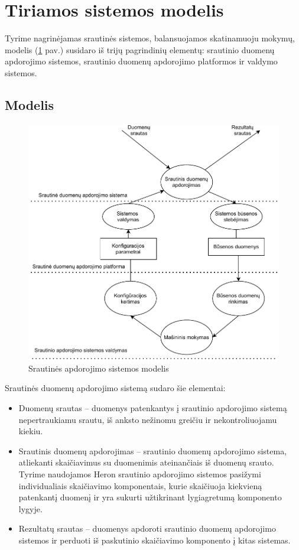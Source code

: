 \documentclass{VUMIFPSbakalaurinis}
\begin{document}
\section{Tiriamos sistemos modelis}

Tyrime nagrinėjamas srautinės sistemos, balansuojamos skatinamuoju mokymų, modelis (\ref{dataflow} pav.) susidaro iš trijų pagrindinių elementų: srautinio duomenų apdorojimo sistemos, srautinio duomenų apdorojimo platformos ir valdymo sistemos. 
\subsection{Modelis}
\begin{figure}[H]
    \includegraphics[width=15cm]{img/DataFlow.pdf}
    \caption{Srautinės apdorojimo sistemos modelis}
    \label{dataflow}
\end{figure} 
Srautinės duomenų apdorojimo sistemą sudaro šie elementai:
\begin{itemize}
    \item Duomenų srautas – duomenys patenkantys į srautinio apdorojimo sistemą nepertraukiamu srautu, iš anksto nežinomu greičiu ir nekontroliuojamu kiekiu.
    \item Srautinis duomenų apdorojimas – srautinio duomenų apdorojimo sistema, atliekanti skaičiavimus su duomenimis ateinančiais iš duomenų srauto. Tyrime naudojamos Heron srautinio apdorojimo sistemos pasižymi individualiais skaičiavimo komponentais, kurie skaičiuoja kiekvieną patenkantį duomenį ir yra sukurti užtikrinant lygiagretumą komponento lygyje.
    \item Rezultatų srautas – duomenys apdoroti srautinio duomenų apdorojimo sistemos ir perduoti iš paskutinio skaičiavimo komponento į kitas sistemas.
\end{itemize}
\end{document}
